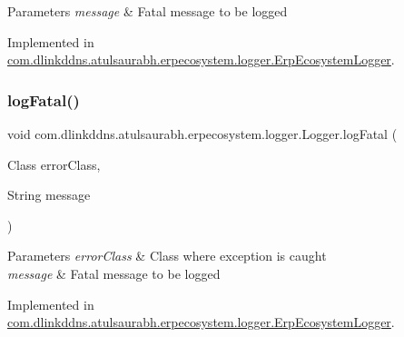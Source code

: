 \begin{DoxyParams}{Parameters}
{\em message} & Fatal message to be logged \\
\hline
\end{DoxyParams}


Implemented in \mbox{\hyperlink{classcom_1_1dlinkddns_1_1atulsaurabh_1_1erpecosystem_1_1logger_1_1_erp_ecosystem_logger_a366c4448e35274f7b1edec8112fb2553}{com.\+dlinkddns.\+atulsaurabh.\+erpecosystem.\+logger.\+Erp\+Ecosystem\+Logger}}.

\mbox{\label{interfacecom_1_1dlinkddns_1_1atulsaurabh_1_1erpecosystem_1_1logger_1_1_logger_ae9763257a2db31ecdfd4675bcdcd3bd0}} 
\subsubsection{\texorpdfstring{log\+Fatal()}{logFatal()}\hspace{0.1cm}{\footnotesize\ttfamily [2/3]}}
{\footnotesize\ttfamily void com.\+dlinkddns.\+atulsaurabh.\+erpecosystem.\+logger.\+Logger.\+log\+Fatal (\begin{DoxyParamCaption}\item[{Class}]{error\+Class,  }\item[{String}]{message }\end{DoxyParamCaption})}


\begin{DoxyParams}{Parameters}
{\em error\+Class} & Class where exception is caught \\
\hline
{\em message} & Fatal message to be logged \\
\hline
\end{DoxyParams}


Implemented in \mbox{\hyperlink{classcom_1_1dlinkddns_1_1atulsaurabh_1_1erpecosystem_1_1logger_1_1_erp_ecosystem_logger_ae9010d95c151f9940d3c4bcbb9a2f4b1}{com.\+dlinkddns.\+atulsaurabh.\+erpecosystem.\+logger.\+Erp\+Ecosystem\+Logger}}.

\mbox{\label{interfacecom_1_1dlinkddns_1_1atulsaurabh_1_1erpecosystem_1_1logger_1_1_logger_ad8e4ea32b41f7d225b8ea824af177a43}} 
